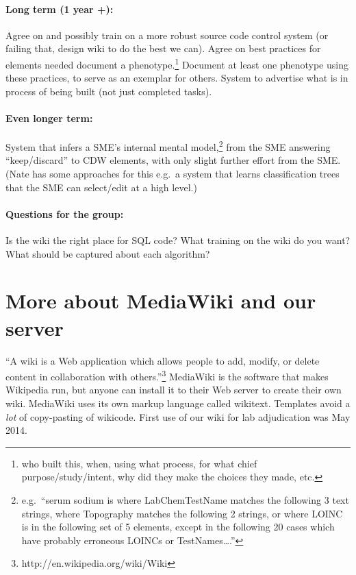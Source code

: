 \documentclass{tufte-handout}
\begin{document}
\paragraph{Long term (1 year +):} Agree on and possibly train on a more
robust source code control system (or failing that, design wiki to do
the best we can). Agree on best practices for elements needed document
a phenotype.\footnote{who built this, when, using what process, for
  what chief purpose/study/intent, why did they make the choices they
  made, etc.} Document at least one phenotype using these practices,
to serve as an exemplar for others. System to advertise what is in
process of being built (not just completed tasks).

\paragraph{Even longer term:} System that infers a SME's internal mental
model,\footnote{e.g.\ ``serum sodium is where LabChemTestName matches
  the following 3 text strings, where Topography matches the following
  2 strings, or where LOINC is in the following set of 5 elements,
  except in the following 20 cases which have probably erroneous
  LOINCs or TestNames\ldots{}.''} from the SME answering
``keep/discard'' to CDW elements, with only slight further effort from
the SME. (Nate has some approaches for this e.g.\ a system that learns
classification trees that the SME can select/edit at a high level.)

\paragraph{Questions for the group:} Is the wiki the right place for
SQL code? What training on the wiki do you want? What should be
captured about each algorithm?


\section{More about MediaWiki and our server}

``A wiki is a Web application which allows people to add, modify, or
delete content in collaboration with
others.''\footnote{http://en.wikipedia.org/wiki/Wiki} MediaWiki is the
software that makes Wikipedia run, but anyone can install it to their
Web server to create their own wiki. MediaWiki uses its own markup
language called wikitext. Templates avoid a \emph{lot} of copy-pasting
of wikicode. First use of our wiki for lab adjudication was May 2014.

\end{document}
